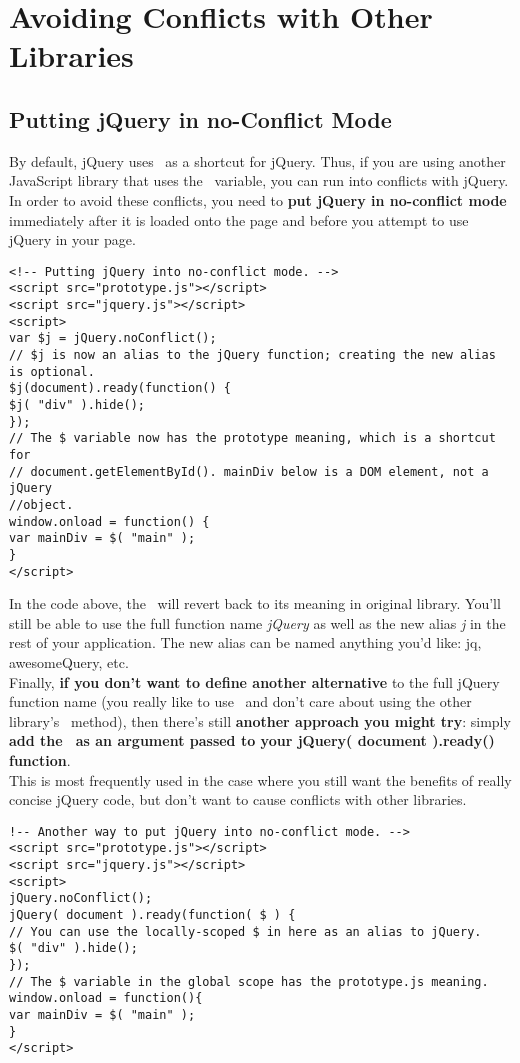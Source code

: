 \documentclass[10pt,letterpaper]{report}
\begin{document}
\section{Avoiding Conflicts with Other Libraries}
\subsection{Putting jQuery in no-Conflict Mode}
By default, jQuery uses \textit{\textdollar}\ as a shortcut for jQuery. Thus, if you are using another JavaScript library that uses the \textit{\textdollar}\ variable, you can run into conflicts with jQuery. In order to avoid these conflicts, you need to \textbf{put jQuery in no-conflict mode} immediately after it is loaded onto the page and before you attempt to use jQuery in your page.
\begin{lstlisting}
<!-- Putting jQuery into no-conflict mode. -->
<script src="prototype.js"></script>
<script src="jquery.js"></script>
<script>
var $j = jQuery.noConflict();
// $j is now an alias to the jQuery function; creating the new alias is optional.
$j(document).ready(function() {
$j( "div" ).hide();
});
// The $ variable now has the prototype meaning, which is a shortcut for
// document.getElementById(). mainDiv below is a DOM element, not a jQuery
//object.
window.onload = function() {
var mainDiv = $( "main" );
}
</script>
\end{lstlisting}
In the code above, the \textit{\textdollar} \, will revert back to its meaning in original library. You'll still be able to use the full function name \textit{jQuery} as well as the new alias \textit{\textdollar j} in the rest of your application. The new alias can be named anything you'd like: jq, awesomeQuery, etc.\\
Finally, \textbf{if you don't want to define another alternative} to the full jQuery function name (you really like to use \textdollar \, and don't care about using the other library's \textdollar \, method), then there's still \textbf{another approach you might try}: simply \textbf{add the \textdollar \, as an argument passed to your jQuery( document ).ready() function}.\\
This is most frequently used in the case where you still want the benefits of really concise jQuery code, but don't want to cause conflicts with other libraries.

\begin{lstlisting}
!-- Another way to put jQuery into no-conflict mode. -->
<script src="prototype.js"></script>
<script src="jquery.js"></script>
<script>
jQuery.noConflict();
jQuery( document ).ready(function( $ ) {
// You can use the locally-scoped $ in here as an alias to jQuery.
$( "div" ).hide();
});
// The $ variable in the global scope has the prototype.js meaning.
window.onload = function(){
var mainDiv = $( "main" );
}
</script>
\end{lstlisting}
\end{document}
